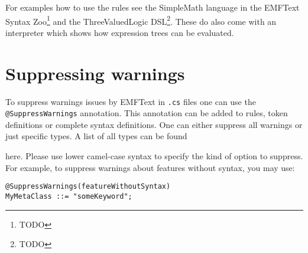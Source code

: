 For examples how to use the \texttt{\@Operator} rules see the SimpleMath
language in the EMFText Syntax Zoo\footnote{TODO} and the ThreeValuedLogic DSL\footnote{TODO}. 
These do also come with an interpreter which shows how expression trees can be 
evaluated.

\section{Suppressing warnings}

To suppress warnings issues by EMFText in \texttt{.cs} files one can use the
\texttt{@SuppressWarnings} annotation. This annotation can be added to rules,
token definitions or complete syntax definitions. One can either suppress all 
warnings or just specific types. A list of all types can be found 

here. Please use lower camel-case syntax to specify the kind of option to suppress. 
For example, to suppress warnings about features without syntax, you may use:

\begin{lstlisting}
@SuppressWarnings(featureWithoutSyntax)
MyMetaClass ::= "someKeyword";
\end{lstlisting}
